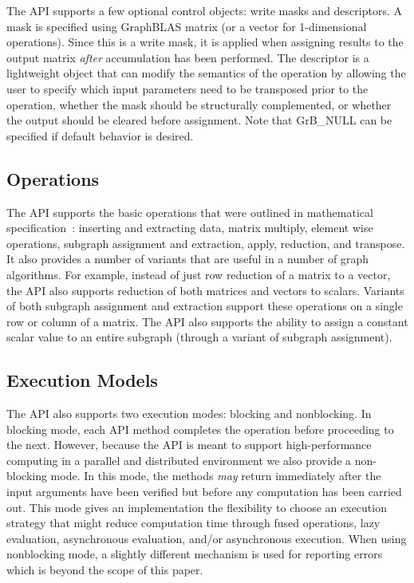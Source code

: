 The API supports a few optional control objects: write masks and descriptors.  A
mask is specified using GraphBLAS matrix (or a vector for 1-dimensional operations).
Since this is a write mask, it is applied when assigning results to the output matrix
{\em after} accumulation has been performed.
The descriptor is a lightweight object that can modify the semantics of the
operation by allowing the user to specify which input parameters need to be transposed
prior to the operation, whether the mask should be structurally complemented, or whether
the output should be cleared before assignment.
Note that {\sf GrB\_NULL} can be specified if default behavior is desired.

\subsection{Operations}

The API supports the basic operations that were outlined in mathematical specification~\cite{mathgraphblas16}:
inserting and extracting data, matrix multiply, element wise operations, subgraph assignment
and extraction, apply, reduction, and transpose.  It also provides a number of
variants that are useful in a number of graph algorithms. For example, instead of
just row reduction of a matrix to a vector, the API also supports reduction of both
matrices and vectors to scalars.  Variants of both subgraph assignment and extraction
support these operations on a single row or column of a matrix.  The API also 
supports the ability to assign a constant
scalar value to an entire subgraph (through a variant of subgraph assignment). 

\subsection{Execution Models}

The API also supports two execution modes: blocking and nonblocking. In blocking mode,
each API method completes the operation before proceeding to the next.  However, 
because the API is meant to support high-performance computing in a parallel and
distributed environment we also provide a non-blocking mode.  In this mode, the methods
{\em may} return immediately after the input arguments have been verified but before
any computation has been carried out.  This mode gives an implementation the flexibility
to choose an execution strategy that might reduce computation time through fused
operations, lazy evaluation, asynchronous evaluation, and/or asynchronous execution.  When
using nonblocking mode, a slightly different mechanism is used for reporting errors which
is beyond the scope of this paper.
